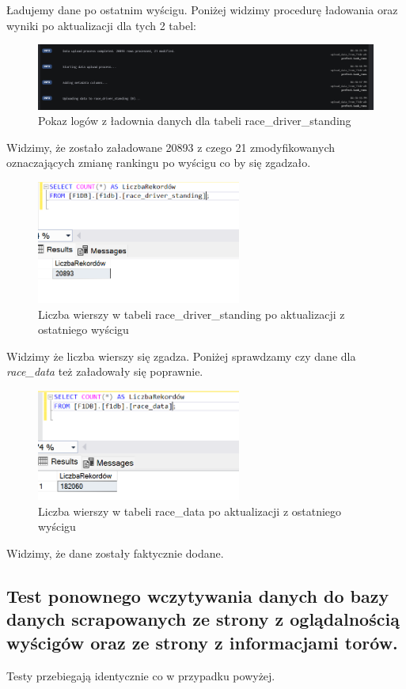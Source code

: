 \documentclass[12pt]{article}
\begin{document}
Ładujemy dane po ostatnim wyścigu. Poniżej widzimy procedurę ładowania oraz wyniki po aktualizacji dla tych 2 tabel:

\begin{figure}[H]
    \centering   \includegraphics[width=\textwidth]{test4.png}
    \caption{Pokaz logów z ładownia danych dla tabeli race\_driver\_standing}
\end{figure}
Widzimy, że zostało załadowane 20893 z czego 21 zmodyfikowanych oznaczających zmianę rankingu po wyścigu co by się zgadzało.
\begin{figure}[H]
    \centering   \includegraphics[width=0.6\textwidth]{test5.png}
    \caption{Liczba wierszy w tabeli race\_driver\_standing po aktualizacji z ostatniego wyścigu}
\end{figure}
Widzimy że liczba wierszy się zgadza. Poniżej sprawdzamy czy dane dla \textit{race\_data} też załadowały się poprawnie.

\begin{figure}[H]
    \centering   \includegraphics[width=0.6\textwidth]{test6.png}
    \caption{Liczba wierszy w tabeli race\_data po aktualizacji z ostatniego wyścigu}
\end{figure}
Widzimy, że dane zostały faktycznie dodane.

\subsection{Test ponownego wczytywania danych do bazy danych scrapowanych ze strony z oglądalnością wyścigów oraz ze strony z informacjami torów.}
Testy przebiegają identycznie co w przypadku powyżej.
\end{document}
